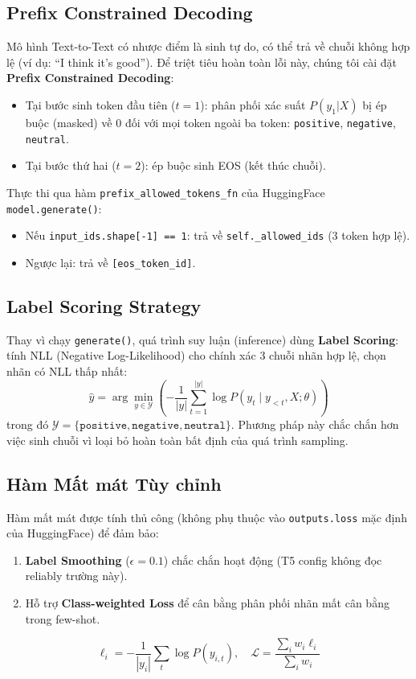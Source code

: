 \documentclass[12pt,a4paper,oneside]{report}
\begin{document}
\subsection{Prefix Constrained Decoding}

Mô hình Text-to-Text có nhược điểm là sinh tự do, có thể trả về chuỗi không hợp lệ (ví dụ: ``I think it's good''). Để triệt tiêu hoàn toàn lỗi này, chúng tôi cài đặt \textbf{Prefix Constrained Decoding}:

\begin{itemize}
    \item Tại bước sinh token đầu tiên ($t=1$): phân phối xác suất $P(y_1 | X)$ bị ép buộc (masked) về 0 đối với mọi token ngoài ba token: \texttt{positive}, \texttt{negative}, \texttt{neutral}.
    \item Tại bước thứ hai ($t=2$): ép buộc sinh EOS (kết thúc chuỗi).
\end{itemize}
Thực thi qua hàm \texttt{prefix\_allowed\_tokens\_fn} của HuggingFace \texttt{model.generate()}:
\begin{itemize}
    \item Nếu \texttt{input\_ids.shape[-1] == 1}: trả về \texttt{self.\_allowed\_ids} (3 token hợp lệ).
    \item Ngược lại: trả về \texttt{[eos\_token\_id]}.
\end{itemize}

\subsection{Label Scoring Strategy}

Thay vì chạy \texttt{generate()}, quá trình suy luận (inference) dùng \textbf{Label Scoring}: tính NLL (Negative Log-Likelihood) cho chính xác 3 chuỗi nhãn hợp lệ, chọn nhãn có NLL thấp nhất:
\begin{equation}
    \hat{y} = \arg\min_{y \in \mathcal{Y}} \left( -\frac{1}{|y|} \sum_{t=1}^{|y|} \log P(y_t \mid y_{<t}, X; \theta) \right)
\end{equation}
trong đó $\mathcal{Y} = \{\texttt{positive}, \texttt{negative}, \texttt{neutral}\}$. Phương pháp này chắc chắn hơn việc sinh chuỗi vì loại bỏ hoàn toàn bất định của quá trình sampling.

\subsection{Hàm Mất mát Tùy chỉnh}

Hàm mất mát được tính thủ công (không phụ thuộc vào \texttt{outputs.loss} mặc định của HuggingFace) để đảm bảo:
\begin{enumerate}
    \item \textbf{Label Smoothing} ($\epsilon = 0.1$) chắc chắn hoạt động (T5 config không đọc reliably trường này).
    \item Hỗ trợ \textbf{Class-weighted Loss} để cân bằng phân phối nhãn mất cân bằng trong few-shot.
\end{enumerate}
\begin{equation}
    \ell_i = -\frac{1}{|y_i|} \sum_t \log P(y_{i,t}), \quad \mathcal{L} = \frac{\sum_i w_i \ell_i}{\sum_i w_i}
\end{equation}
\end{document}
